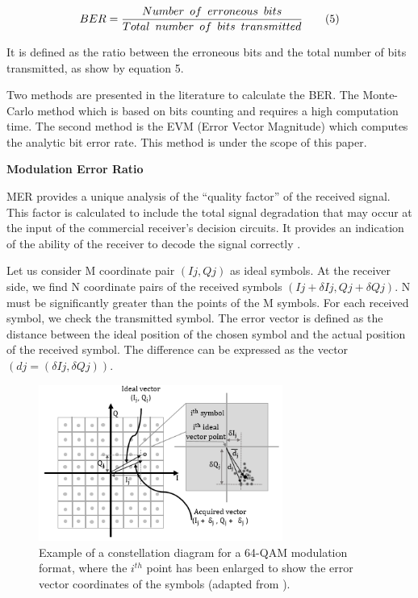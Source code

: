 \documentclass[10pt, conference]{IEEEtran}
\begin{document}
{\begin{adjustwidth}{1cm}{0cm}
{\scriptsize 

\[
  BER = \frac{Number\hspace{0.5em}of\hspace{0.5em}erroneous\hspace{0.5em}bits}{Total\hspace{0.5em}number\hspace{0.5em}of\hspace{0.5em}bits\hspace{0.5em}transmitted}
  \hspace{2em} (5)
\]}
\end{adjustwidth}
It is defined as the ratio between the erroneous bits and the total number of bits transmitted, as show by equation
5.

\noindent Two methods are presented in the literature to calculate
the BER. The Monte-Carlo method which is based on
bits counting and requires a high computation time. The
second method is the EVM (Error Vector Magnitude)
which computes the analytic bit error rate. This method
is under the scope of this paper.

\begin{adjustwidth}{-0.5cm}{0cm}
   \textbullet \textbf{  Modulation Error Ratio}
\end{adjustwidth}
MER provides a unique analysis of the “quality factor”
of the received signal. This factor is calculated to include
the total signal degradation that may occur at the input
of the commercial receiver’s decision circuits. It provides
an indication of the ability of the receiver to decode the
signal correctly \cite{15}.

\noindent Let us consider M coordinate pair $(Ij, Qj)$ as ideal symbols. At the receiver side, we find N coordinate pairs
of the received symbols $(Ij + \delta Ij, Qj + \delta Qj)$. N must be
significantly  greater than the points
 of the M symbols. For
each received symbol, we check the transmitted symbol.
The error vector is defined as the distance between the ideal position of the chosen symbol and the actual
position of the received symbol. The difference can be
expressed as the vector $(dj = (\delta Ij, \delta Qj))$.

\begin{figure}[!htbp]
\centering
\includegraphics[width=8cm]{graph.png}
\begin{adjustwidth}{-0.13cm}{0cm}
\caption{\footnotesize Example of a constellation diagram for a 64-QAM modulation format, where the $i^{th}$ point has been enlarged to show the error vector coordinates of the symbols (adapted from \cite{20}).}
\end{adjustwidth}
\end{figure}

}
\end{document}
